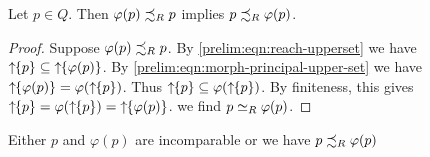 \begin{proposition} \label{prelim:automata:prop:endo-reach-order}
 Let $p \in Q$.
 Then $\varphi(p) \precsim_R p$ implies $p \precsim_R \varphi(p)$.	
\end{proposition}
\begin{proof}
	Suppose $\varphi(p) \precsim_R p$.
	By \cref{prelim:eqn:reach-upperset} 
	we have $\mbox{\ensuremath{\displaystyle \uparrow \!\!\{p\}}}\subseteq \mbox{\ensuremath{\displaystyle \uparrow \!\!\{\varphi(p)\}}}$.
	By \cref{prelim:eqn:morph-principal-upper-set} 
	we have $\mbox{\ensuremath{\displaystyle \uparrow \!\!\{\varphi(p)\}}} = \varphi(\mbox{\ensuremath{\displaystyle \uparrow \!\!\{p\}}})$.
	Thus $\mbox{\ensuremath{\displaystyle \uparrow \!\!\{p\}}}\subseteq \varphi(\mbox{\ensuremath{\displaystyle \uparrow \!\!\{p\}}})$.
	By finiteness, this gives 
	$\mbox{\ensuremath{\displaystyle \uparrow \!\!\{p\}}} = \varphi(\mbox{\ensuremath{\displaystyle \uparrow \!\!\{p\}}}) = \mbox{\ensuremath{\displaystyle \uparrow \!\!\{\varphi(p)\}}}$.
	we find $p \simeq_R \varphi(p)$.
\end{proof}

\begin{corollary}
	Either $p$ and $\varphi(p)$ are incomparable or we have $p \precsim_R \varphi(p)$
\end{corollary}

